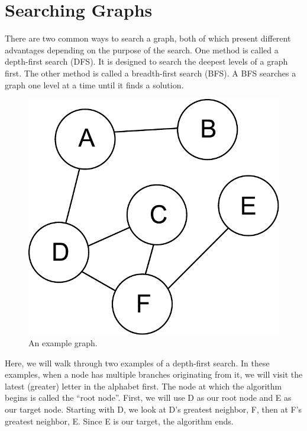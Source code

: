\section*{Searching Graphs}
There are two common ways to search a graph, both of which present different advantages depending on the purpose of the search.
One method is called a depth-first search (DFS).  It is designed to search the deepest levels of a graph first.
The other method is called a breadth-first search (BFS).  A BFS searches a graph one level at a time until it finds a solution.
\begin{figure}[h]
\centering
\includegraphics[width=.5\textwidth]{graph.pdf}
\caption{An example graph.}
\label{fig:bfs_dfs_graph}
\end{figure}

Here, we will walk through two examples of a depth-first search.
In these examples, when a node has multiple branches originating from it,
we will visit the latest (greater) letter in the alphabet first.
The node at which the algorithm begins is called the ``root node''.
First, we will use D as our root node and E as our target node.
Starting with D, we look at D's greatest neighbor, F, then at F's greatest
neighbor, E. Since E is our target, the algorithm ends.

